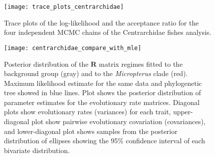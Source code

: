 \pagebreak

\begin{figure}[h]
	\centering
	\texttt{[image: trace\_plots\_centrarchidae]}
	\caption{Trace plots of the log-likelihood and the acceptance ratio for the four independent MCMC chains of the Centrarchidae fishes analysis. }
	\label{fig:sup_trace_centrarchidae}
\end{figure}

\pagebreak

\begin{figure}[h]
	\centering
	\texttt{[image: centrarchidae\_compare\_with\_mle]}
	\caption{Posterior distribution of the $\mathbf{R}$ matrix regimes fitted to the background group (gray) and to the \textit{Micropterus} clade (red). Maximum likelihood estimate for the same data and phylogenetic tree showed in blue lines. Plot shows the posterior distribution of parameter estimates for the evolutionary rate matrices. Diagonal plots show evolutionary rates (variances) for each trait, upper-diagonal plot show pairwise evolutionary covariation (covariances), and lower-diagonal plot shows samples from the posterior distribution of ellipses showing the 95\% confidence interval of each bivariate distribution.}
	\label{fig:centrarchidae_mle}
\end{figure}